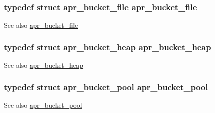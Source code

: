 \subsubsection[{\texorpdfstring{apr\+\_\+bucket\+\_\+file}{apr_bucket_file}}]{\setlength{\rightskip}{0pt plus 5cm}typedef struct {\bf apr\+\_\+bucket\+\_\+file} {\bf apr\+\_\+bucket\+\_\+file}}\hypertarget{group__APR__Util__Bucket__Brigades_ga1a786f7edac4d7a2c212f0fe74457b3d}{}\label{group__APR__Util__Bucket__Brigades_ga1a786f7edac4d7a2c212f0fe74457b3d}
\begin{DoxySeeAlso}{See also}
\hyperlink{structapr__bucket__file}{apr\+\_\+bucket\+\_\+file} 
\end{DoxySeeAlso}
\subsubsection[{\texorpdfstring{apr\+\_\+bucket\+\_\+heap}{apr_bucket_heap}}]{\setlength{\rightskip}{0pt plus 5cm}typedef struct {\bf apr\+\_\+bucket\+\_\+heap} {\bf apr\+\_\+bucket\+\_\+heap}}\hypertarget{group__APR__Util__Bucket__Brigades_gaede6e77d621d0f3f7d2685d489d01283}{}\label{group__APR__Util__Bucket__Brigades_gaede6e77d621d0f3f7d2685d489d01283}
\begin{DoxySeeAlso}{See also}
\hyperlink{structapr__bucket__heap}{apr\+\_\+bucket\+\_\+heap} 
\end{DoxySeeAlso}
\subsubsection[{\texorpdfstring{apr\+\_\+bucket\+\_\+pool}{apr_bucket_pool}}]{\setlength{\rightskip}{0pt plus 5cm}typedef struct {\bf apr\+\_\+bucket\+\_\+pool} {\bf apr\+\_\+bucket\+\_\+pool}}\hypertarget{group__APR__Util__Bucket__Brigades_ga211e00d871029de148116cd24b070aed}{}\label{group__APR__Util__Bucket__Brigades_ga211e00d871029de148116cd24b070aed}
\begin{DoxySeeAlso}{See also}
\hyperlink{structapr__bucket__pool}{apr\+\_\+bucket\+\_\+pool} 
\end{DoxySeeAlso}
